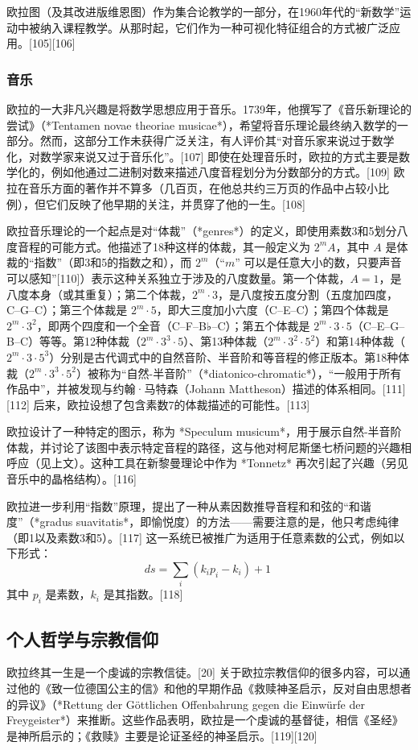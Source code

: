 欧拉图（及其改进版维恩图）作为集合论教学的一部分，在1960年代的“新数学”运动中被纳入课程教学。从那时起，它们作为一种可视化特征组合的方式被广泛应用。[105][106]
\subsubsection{音乐} 
欧拉的一大非凡兴趣是将数学思想应用于音乐。1739年，他撰写了《音乐新理论的尝试》（*Tentamen novae theoriae musicae*），希望将音乐理论最终纳入数学的一部分。然而，这部分工作未获得广泛关注，有人评价其“对音乐家来说过于数学化，对数学家来说又过于音乐化”。[107] 即使在处理音乐时，欧拉的方式主要是数学化的，例如他通过二进制对数来描述八度音程划分为分数部分的方式。[109] 欧拉在音乐方面的著作并不算多（几百页，在他总共约三万页的作品中占较小比例），但它们反映了他早期的关注，并贯穿了他的一生。[108]  

欧拉音乐理论的一个起点是对“体裁”（*genres*）的定义，即使用素数3和5划分八度音程的可能方式。他描述了18种这样的体裁，其一般定义为 \( 2^m A \)，其中 \( A \) 是体裁的“指数”（即3和5的指数之和），而 \( 2^m \)（“\( m \)” 可以是任意大小的数，只要声音可以感知”[110]）表示这种关系独立于涉及的八度数量。第一个体裁，\( A = 1 \)，是八度本身（或其重复）；第二个体裁，\( 2^m \cdot 3 \)，是八度按五度分割（五度加四度，C–G–C）；第三个体裁是 \( 2^m \cdot 5 \)，即大三度加小六度（C–E–C）；第四个体裁是 \( 2^m \cdot 3^2 \)，即两个四度和一个全音（C–F–B♭–C）；第五个体裁是 \( 2^m \cdot 3 \cdot 5 \)（C–E–G–B–C）等等。第12种体裁（\( 2^m \cdot 3^3 \cdot 5 \)）、第13种体裁（\( 2^m \cdot 3^2 \cdot 5^2 \)）和第14种体裁（\( 2^m \cdot 3 \cdot 5^3 \)）分别是古代调式中的自然音阶、半音阶和等音程的修正版本。第18种体裁（\( 2^m \cdot 3^3 \cdot 5^2 \)）被称为“自然-半音阶”（*diatonico-chromatic*），“一般用于所有作品中”，并被发现与约翰·马特森（Johann Mattheson）描述的体系相同。[111][112] 后来，欧拉设想了包含素数7的体裁描述的可能性。[113]  

欧拉设计了一种特定的图示，称为 *Speculum musicum*，用于展示自然-半音阶体裁，并讨论了该图中表示特定音程的路径，这与他对柯尼斯堡七桥问题的兴趣相呼应（见上文）。这种工具在新黎曼理论中作为 *Tonnetz* 再次引起了兴趣（另见音乐中的晶格结构）。[116]  

欧拉进一步利用“指数”原理，提出了一种从素因数推导音程和和弦的“和谐度”（*gradus suavitatis*，即愉悦度）的方法——需要注意的是，他只考虑纯律（即1以及素数3和5）。[117] 这一系统已被推广为适用于任意素数的公式，例如以下形式：  
\[
ds = \sum_{i} (k_i p_i - k_i) + 1~
\]
其中 \( p_i \) 是素数，\( k_i \) 是其指数。[118]
\subsection{个人哲学与宗教信仰}  
欧拉终其一生是一个虔诚的宗教信徒。[20] 关于欧拉宗教信仰的很多内容，可以通过他的《致一位德国公主的信》和他的早期作品《救赎神圣启示，反对自由思想者的异议》（*Rettung der Göttlichen Offenbahrung gegen die Einwürfe der Freygeister*）来推断。这些作品表明，欧拉是一个虔诚的基督徒，相信《圣经》是神所启示的；《救赎》主要是论证圣经的神圣启示。[119][120]  

